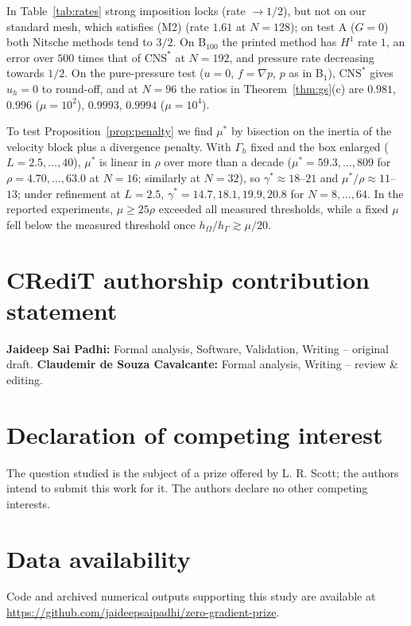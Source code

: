 \documentclass[5p,times]{elsarticle}
\theoremstyle{definition}
\newcommand{\hG}{h_\Gamma}
\newcommand{\hO}{h_\Omega}
\newcommand{\Gh}{\Gamma_h}
\newcommand{\CNS}{\mathrm{CNS}^\ast}
\begin{document}
In Table~\ref{tab:rates} strong imposition locks (rate $\to1/2$), but not on our standard mesh, which satisfies (M2) (rate $1.61$ at $N=128$); on test A ($G=0$) both Nitsche methods tend to $3/2$. On B$_{100}$ the printed method has $H^1$ rate $1$, an error over $500$ times that of $\CNS$ at $N=192$, and pressure rate decreasing towards $1/2$. On the pure-pressure test ($u=0$, $f=\nabla p$, $p$ as in B$_1$), $\CNS$ gives $u_h=0$ to round-off, and at $N=96$ the ratios in Theorem~\ref{thm:gs}(c) are $0.981$, $0.996$ ($\mu=10^2$), $0.9993$, $0.9994$ ($\mu=10^4$).



To test Proposition~\ref{prop:penalty} we find $\mu^\ast$ by bisection on the inertia of the velocity block plus a divergence penalty. With $\Gh$ fixed and the box enlarged ($L=2.5,\dots,40$), $\mu^\ast$ is linear in $\rho$ over more than a decade ($\mu^\ast=59.3,\dots,809$ for $\rho=4.70,\dots,63.0$ at $N=16$; similarly at $N=32$), so $\gamma^\ast\approx18$--$21$ and $\mu^\ast/\rho\approx11$--$13$; under refinement at $L=2.5$, $\gamma^\ast=14.7,18.1,19.9,20.8$ for $N=8,\dots,64$. In the reported experiments, $\mu\ge25\rho$ exceeded all measured thresholds, while a fixed $\mu$ fell below the measured threshold once $\hO/\hG\gtrsim\mu/20$.

\section*{CRediT authorship contribution statement}
\textbf{Jaideep Sai Padhi:} Formal analysis, Software, Validation, Writing -- original draft. \textbf{Claudemir de Souza Cavalcante:} Formal analysis, Writing -- review \& editing.

\section*{Declaration of competing interest}
The question studied is the subject of a prize offered by L. R. Scott; the authors intend to submit this work for it. The authors declare no other competing interests.

\section*{Data availability}
{\sloppy Code and archived numerical outputs supporting this study are available at \url{https://github.com/jaideepsaipadhi/zero-gradient-prize}.\par}
\end{document}
